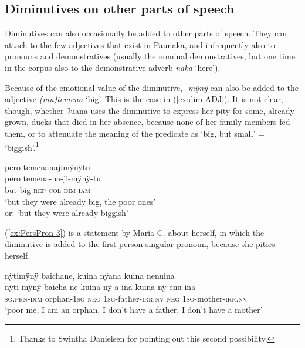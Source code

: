 

\subsection{Diminutives on other parts of speech}\label{sec:Diminuitves_OtherPOS}

Diminutives can also occasionally be added to other parts of speech. They can attach to the few adjectives that exist in Paunaka, and infrequently also to pronouns and demonstratives (usually the nominal demonstratives, but one time in the corpus also to the demonstrative adverb \textit{naka} ‘here’).

Because of the emotional value of the diminutive, \textit{-mÿnÿ} can also be added to the adjective \textit{(mu)temena} ‘big’. This is the case in (\ref{ex:dim-ADJ}). It is not clear, though, whether Juana uses the diminutive to express her pity for some, already grown, ducks that died in her absence, because none of her family members fed them, or to attenuate the meaning of the predicate as ‘big, but small’ = ‘biggish’.\footnote{Thanks to Swintha Danielsen for pointing out this second possibility.}


\ea\label{ex:dim-ADJ}
\begingl 
\glpreamble pero temenanajimÿnÿtu\\
\gla pero temena-na-ji-mÿnÿ-tu\\ 
\glb but big-\textsc{rep}-\textsc{col}-\textsc{dim}-\textsc{iam}\\ 
\glft ‘but they were already big, the poor ones’\\or: ‘but they were already biggish’
\xe
{}

(\ref{ex:PersPron-3}) is a statement by María C. about herself, in which the diminutive is added to the first person singular pronoun, because she pities herself.

\ea\label{ex:PersPron-3}
\begingl
\glpreamble nÿtimÿnÿ baichane, kuina nÿana kuina nenuina\\
\gla nÿti-mÿnÿ baicha-ne kuina nÿ-a-ina kuina nÿ-enu-ina\\
\textsc{sg.prn}-\textsc{dim} orphan-1\textsc{sg} \textsc{neg} 1\textsc{sg}-father-\textsc{irr.nv} \textsc{neg} 1\textsc{sg}-mother-\textsc{irr.nv}\\
\glft ‘poor me, I am an orphan, I don’t have a father, I don’t have a mother’
\endgl
\trailingcitation{[uxx-p110825l.071]}
\xe

